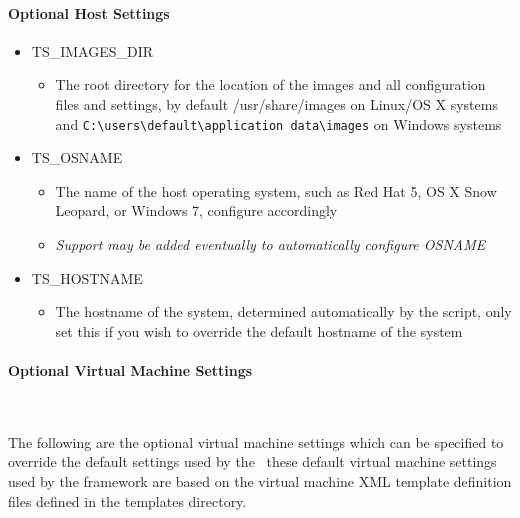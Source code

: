 \paragraph*{Optional Host Settings}
\begin{itemize}
\item	TS\_IMAGES\_DIR
		\begin{itemize}
		\item	The root directory for the location of the \cernvm images and all
				configuration files and settings, by default /usr/share/images on
				Linux/OS X systems and \verb|C:\users\default\application data\images|
				on Windows systems
		\end{itemize}
		
\item	TS\_OSNAME
		\begin{itemize}
		\item	The name of the host operating system, such as Red Hat 5, OS X
				Snow Leopard, or Windows 7, configure accordingly
		\item	\emph{Support may be added eventually to automatically configure OSNAME}
		\end{itemize}
		
\item	TS\_HOSTNAME
		\begin{itemize}
		\item	The hostname of the system, determined automatically by the script,
				only set this if you wish to override the default hostname of the
				system
		\end{itemize}
\end{itemize}


\paragraph*{Optional Virtual Machine Settings}~\newline

The following are the optional virtual machine settings which can be specified to override
the default settings used by the \cernvmtestframework\, these default virtual machine settings
used by the framework are based on the virtual machine XML template definition files defined
in the templates directory.
 

